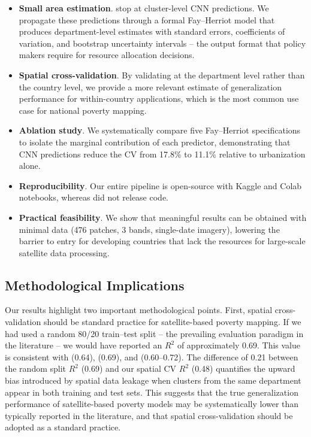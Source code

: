 \documentclass[11pt,a4paper]{article}
\newcommand{\Rtwo}{\ensuremath{R^2}}
\begin{document}
\begin{itemize}
    \item \textbf{Small area estimation}. \citet{perez2017} stop at cluster-level CNN predictions. We propagate these predictions through a formal Fay--Herriot model that produces department-level estimates with standard errors, coefficients of variation, and bootstrap uncertainty intervals -- the output format that policy makers require for resource allocation decisions.
    \item \textbf{Spatial cross-validation}. By validating at the department level rather than the country level, we provide a more relevant estimate of generalization performance for within-country applications, which is the most common use case for national poverty mapping.
    \item \textbf{Ablation study}. We systematically compare five Fay--Herriot specifications to isolate the marginal contribution of each predictor, demonstrating that CNN predictions reduce the CV from 17.8\% to 11.1\% relative to urbanization alone.
    \item \textbf{Reproducibility}. Our entire pipeline is open-source with Kaggle and Colab notebooks, whereas \citet{perez2017} did not release code.
    \item \textbf{Practical feasibility}. We show that meaningful results can be obtained with minimal data (476 patches, 3 bands, single-date imagery), lowering the barrier to entry for developing countries that lack the resources for large-scale satellite data processing.
\end{itemize}

\subsection{Methodological Implications}

Our results highlight two important methodological points. First, spatial cross-validation should be standard practice for satellite-based poverty mapping. If we had used a random 80/20 train--test split -- the prevailing evaluation paradigm in the literature -- we would have reported an \Rtwo{} of approximately 0.69. This value is consistent with \citet{perez2017} (0.64), \citet{deepwealth2024} (0.69), and \citet{yeh2020} (0.60--0.72). The difference of 0.21 between the random split \Rtwo{} (0.69) and our spatial CV \Rtwo{} (0.48) quantifies the upward bias introduced by spatial data leakage when clusters from the same department appear in both training and test sets. This suggests that the true generalization performance of satellite-based poverty models may be systematically lower than typically reported in the literature, and that spatial cross-validation should be adopted as a standard practice.
\end{document}
